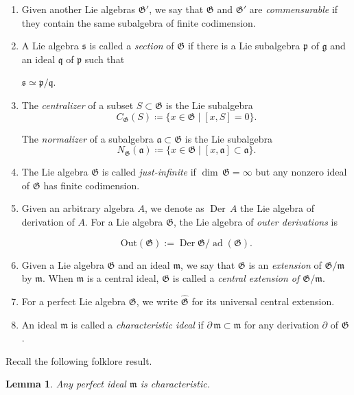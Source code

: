 \documentclass[11pt, letterpaper, reqno]{amsart}
\newtheorem{lemma}[theorem]{Lemma}
\theoremstyle{definition}
\newcommand{\ad}{\operatorname{ad}}
\newcommand{\Der}{\operatorname{Der}}
\newcommand{\fa}{\mathfrak{a}}
\newcommand{\fg}{\mathfrak{g}}
\newcommand{\fm}{\mathfrak{m}}
\newcommand{\fp}{\mathfrak{p}}
\newcommand{\fq}{\mathfrak{q}}
\newcommand{\fs}{\mathfrak{s}}
\newcommand{\fG}{\mathfrak{G}}
\newcommand{\Out}{\mathrm{Out}}
\begin{document}
\begin{enumerate}
\item[(a)]  Given another Lie algebras $\fG'$,
we say that $\fG$ and $\fG'$ are {\it commensurable} if they contain the same   subalgebra of finite codimension. 

\item[(b)] A Lie algebra
$\fs$ is called a {\it section} of $\fG$ if there is a Lie subalgebra  $\fp$ of $\fg$ and an ideal
$\fq$ of $\fp$ such that 

\centerline{$\fs\simeq \fp/\fq$.}

\item[(c)] The {\it centralizer} of a subset $S\subset\fG$ is the Lie subalgebra
$$C_\fG(S)\coloneqq\{x\in \fG\mid [x,S]=0\}.$$

The {\it normalizer} of a subalgebra 
$\fa\subset\fG$ is the Lie subalgebra
$$N_\fG(\fa)\coloneqq\{x\in \fG
\mid [x,\fa]\subset\fa\}.$$




\item[(d)]
The  Lie algebra $\fG$ is called  {\it just-infinite} if $\dim\,\fG=\infty$ but any nonzero ideal
of $\fG$ has finite codimension.

\item[(e)] Given an arbitrary algebra $A$, we denote as $\Der\,A$ the Lie algebra of derivation of $A$.
For a Lie algebra $\fG$, the Lie algebra of {\it outer derivations} is

$$\Out(\fG):= \Der\fG/\ad(\fG).$$

\item[(f)] Given a Lie algebra $\fG$ and an ideal
$\fm$, we say that $\fG$ is an {\it extension} of
$\fG/\fm$ by $\fm$. When $\fm$ is a central ideal,
$\fG$ is called a {\it central extension of 
$\fG/\fm$}. 

\item[(g)]  For a perfect Lie algebra $\fG$,
we write $\widehat{\fG}$ for its  universal central extension.

\item[(h)]
An ideal $\fm$ is called a 
{\it characteristic ideal} if
$\partial \,\fm\subset\fm$ for any
derivation $\partial$ of $\fG$.
\end{enumerate}



Recall the following folklore result.

\begin{lemma}\label{perfect-char} Any perfect ideal $\fm$ is characteristic.
\end{lemma}
\end{document}
